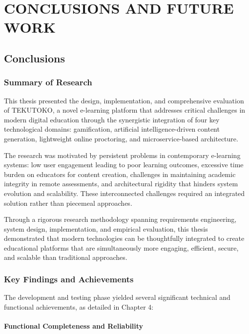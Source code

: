 \chapter{CONCLUSIONS AND FUTURE WORK}
\label{chap:conclusion}

\section{Conclusions}
\label{sec:conclusions}

\subsection{Summary of Research}

This thesis presented the design, implementation, and comprehensive evaluation of TEKUTOKO, a novel e-learning platform that addresses critical challenges in modern digital education through the synergistic integration of four key technological domains: gamification, artificial intelligence-driven content generation, lightweight online proctoring, and microservice-based architecture.

The research was motivated by persistent problems in contemporary e-learning systems: low user engagement leading to poor learning outcomes, excessive time burden on educators for content creation, challenges in maintaining academic integrity in remote assessments, and architectural rigidity that hinders system evolution and scalability. These interconnected challenges required an integrated solution rather than piecemeal approaches.

Through a rigorous research methodology spanning requirements engineering, system design, implementation, and empirical evaluation, this thesis demonstrated that modern technologies can be thoughtfully integrated to create educational platforms that are simultaneously more engaging, efficient, secure, and scalable than traditional approaches.

\subsection{Key Findings and Achievements}

The development and testing phase yielded several significant technical and functional achievements, as detailed in Chapter 4:

\subsubsection{Functional Completeness and Reliability}

